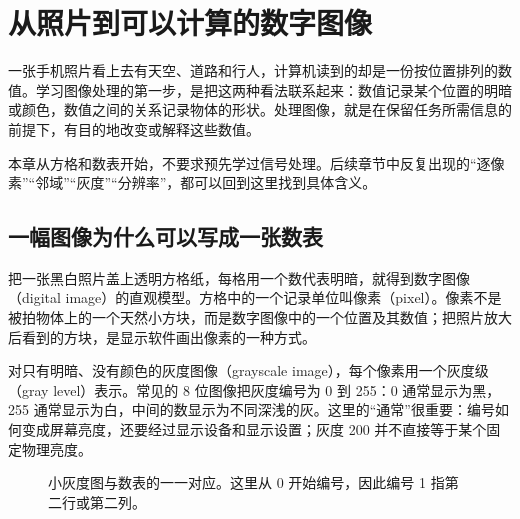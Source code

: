 \section{从照片到可以计算的数字图像}
\label{sec:foundations-image}

一张手机照片看上去有天空、道路和行人，计算机读到的却是一份按位置排列的数值。学习图像处理的第一步，是把这两种看法联系起来：数值记录某个位置的明暗或颜色，数值之间的关系记录物体的形状。处理图像，就是在保留任务所需信息的前提下，有目的地改变或解释这些数值。

本章从方格和数表开始，不要求预先学过信号处理。后续章节中反复出现的“逐像素”“邻域”“灰度”“分辨率”，都可以回到这里找到具体含义。

\subsection{一幅图像为什么可以写成一张数表}

把一张黑白照片盖上透明方格纸，每格用一个数代表明暗，就得到数字图像（digital image）的直观模型。方格中的一个记录单位叫像素（pixel）。像素不是被拍物体上的一个天然小方块，而是数字图像中的一个位置及其数值；把照片放大后看到的方块，是显示软件画出像素的一种方式。

对只有明暗、没有颜色的灰度图像（grayscale image），每个像素用一个灰度级（gray level）表示。常见的 8 位图像把灰度编号为 0 到 255：0 通常显示为黑，255 通常显示为白，中间的数显示为不同深浅的灰。这里的“通常”很重要：编号如何变成屏幕亮度，还要经过显示设备和显示设置；灰度 200 并不直接等于某个固定物理亮度。

\begin{figure}[htbp]
\centering
{}
\caption{小灰度图与数表的一一对应。这里从 0 开始编号，因此编号 1 指第二行或第二列。}
\label{fig:foundation-grid}
\end{figure}

